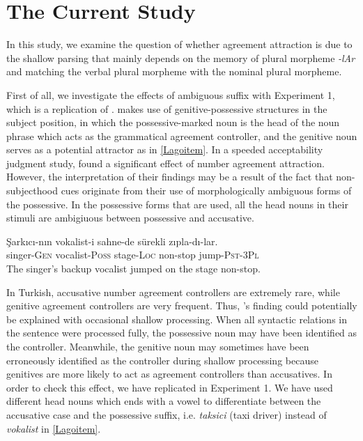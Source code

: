 \documentclass[doc]{apa6}
\begin{document}
\hypertarget{the-current-study}{%
\section{The Current Study}\label{the-current-study}}

In this study, we examine the question of whether agreement attraction is due to the shallow parsing that mainly depends on the memory of plural morpheme \emph{-lAr} and matching the verbal plural morpheme with the nominal plural morpheme.

First of all, we investigate the effects of ambiguous suffix with Experiment 1, which is a replication of \textcite{Lago2018}. \textcite{Lago2018} makes use of genitive-possessive structures in the subject position, in which the possessive-marked noun is the head of the noun phrase which acts as the grammatical agreement controller, and the genitive noun serves as a potential attractor as in \autoref{Lagoitem}. In a speeded acceptability judgment study, \textcite{Lago2018} found a significant effect of number agreement attraction. However, the interpretation of their findings may be a result of the fact that non-subjecthood cues originate from their use of morphologically ambiguous forms of the possessive. In the possessive forms that are used, all the head nouns in their stimuli are ambigiuous between possessive and accusative.

\begin{exe}
\ex \label{Lagoitem}
\gll \c{S}ark{\i}c{\i}-n{\i}n vokalist-i sahne-de s\"{u}rekli z{\i}pla-d{\i}-lar.\\
singer-\textsc{Gen} vocalist-\textsc{Poss} stage-\textsc{Loc} non-stop jump-\textsc{Pst}-\textsc{3Pl}\\
\glt The singer's backup vocalist jumped on the stage non-stop.
\end{exe}

In Turkish, accusative number agreement controllers are extremely rare, while genitive agreement controllers are very frequent. Thus, \textcite{Lago2018}'s finding could potentially be explained with occasional shallow processing. When all syntactic relations in the sentence were processed fully, the possessive noun may have been identified as the controller. Meanwhile, the genitive noun may sometimes have been erroneously identified as the controller during shallow processing because genitives are more likely to act as agreement controllers than accusatives. In order to check this effect, we have replicated \textcite{Lago2018} in Experiment 1. We have used different head nouns which ends with a vowel to differentiate between the accusative case and the possessive suffix, i.e. \emph{taksici} (taxi driver) instead of \emph{vokalist} in \autoref{Lagoitem}.
\end{document}
